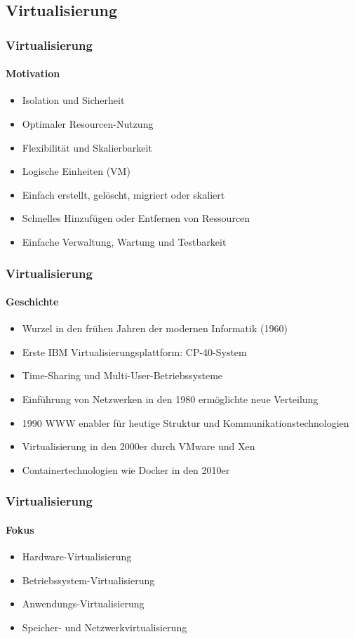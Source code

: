 \subsection{Virtualisierung}
\begin{frame}
  \frametitle{Virtualisierung}
  \framesubtitle{Motivation}
  \begin{itemize}
    \item Isolation und Sicherheit 
    \item Optimaler Resourcen-Nutzung
    \item Flexibilität und Skalierbarkeit
    \item Logische Einheiten (VM)
    \item Einfach erstellt, gelöscht, migriert oder skaliert
    \item Schnelles Hinzufügen oder Entfernen von Ressourcen
    \item Einfache Verwaltung, Wartung und Testbarkeit
  \end{itemize}
\end{frame}


\begin{frame}
  \frametitle{Virtualisierung}
  \framesubtitle{Geschichte}
  \begin{itemize}
    \item Wurzel in den frühen Jahren der modernen Informatik (1960)
    \item Erste IBM Virtualisierungsplattform: CP-40-System
    \item Time-Sharing und Multi-User-Betriebssysteme
    \item Einführung von Netzwerken in den 1980 ermöglichte neue Verteilung
    \item 1990 WWW enabler für heutige Struktur und Kommunikationstechnologien
    \item Virtualisierung in den 2000er durch VMware und Xen
    \item Containertechnologien wie Docker in den 2010er
  \end{itemize}
\end{frame}


\begin{frame}
  \frametitle{Virtualisierung}
  \framesubtitle{Fokus}
  \begin{itemize}
    \item Hardware-Virtualisierung
    \item Betriebssystem-Virtualisierung
    \item Anwendungs-Virtualisierung
    \item Speicher- und Netzwerkvirtualisierung
  \end{itemize}
\end{frame}

